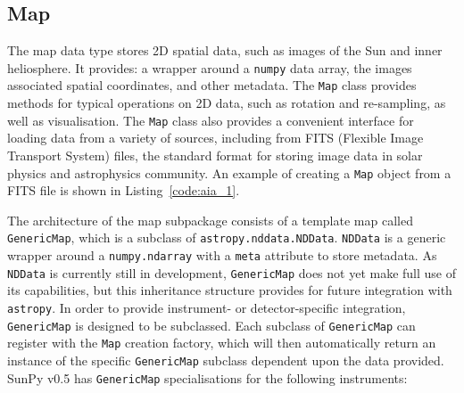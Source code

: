 \subsection{Map}\label{ssec:map}
The map data type stores 2D spatial data, such as images of the Sun and 
inner heliosphere. It provides: a wrapper around a \texttt{numpy} data array, 
the images associated spatial coordinates, and other metadata. The \texttt{Map} 
class provides methods for typical operations on 2D data, such as rotation and 
re-sampling, as well as visualisation.
The \texttt{Map} class also provides a convenient interface for loading data 
from a variety of sources, including from FITS (Flexible Image Transport System) 
files, the standard format for storing image data in solar physics and astrophysics community. 
An example of creating a \texttt{Map} object from a FITS file is shown in 
Listing~\ref{code:aia_1}.

The architecture of the map subpackage consists of a template map called
\texttt{GenericMap}, which is a subclass of \texttt{astropy.nddata.NDData}. 
\texttt{NDData} is a generic wrapper around a \texttt{numpy.ndarray} with a 
\texttt{meta} attribute to store metadata.
As \texttt{NDData} is currently still in development, \texttt{GenericMap} does 
not yet make full use of its capabilities, but this inheritance structure 
provides for future integration with \texttt{astropy}. In order to provide 
instrument- or detector-specific integration, \texttt{GenericMap} is designed
to be subclassed. Each subclass of \texttt{GenericMap} can register 
with the \texttt{Map} creation factory, which will then automatically return an instance
of the specific \texttt{GenericMap} subclass dependent upon the data provided. 
SunPy v0.5 has \texttt{GenericMap} specialisations for the following 
instruments: 


